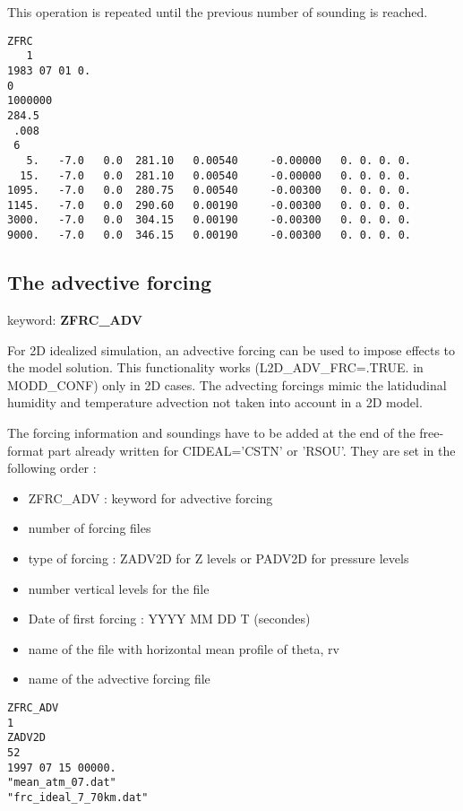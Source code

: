 This operation is repeated until the previous number of sounding is reached.

\begin{verbatim}
ZFRC
   1
1983 07 01 0.
0
1000000
284.5
 .008
 6
   5.   -7.0   0.0  281.10   0.00540     -0.00000   0. 0. 0. 0.
  15.   -7.0   0.0  281.10   0.00540     -0.00000   0. 0. 0. 0.
1095.   -7.0   0.0  280.75   0.00540     -0.00300   0. 0. 0. 0.
1145.   -7.0   0.0  290.60   0.00190     -0.00300   0. 0. 0. 0.
3000.   -7.0   0.0  304.15   0.00190     -0.00300   0. 0. 0. 0.
9000.   -7.0   0.0  346.15   0.00190     -0.00300   0. 0. 0. 0.
\end{verbatim}

\subsection{The advective forcing} \label{ss:adv_forcing}

keyword: {\bf ZFRC\_ADV} 

For 2D idealized simulation, an advective forcing can be used to impose effects to the model solution. This functionality works (L2D\_ADV\_FRC=.TRUE. in MODD\_CONF) only in 2D cases. The advecting forcings mimic the latidudinal humidity and temperature advection not taken into account in a 2D model.
         
The forcing information and soundings have to be added at the end of the
free-format part already written for CIDEAL='CSTN' or 'RSOU'. They are set in the following order : 
\begin{itemize}
\item ZFRC\_ADV : keyword for advective forcing
\item number of forcing files
\item type of forcing : ZADV2D for Z levels or PADV2D for  pressure levels
\item number vertical levels for the file
\item Date of first forcing : YYYY MM DD T (secondes)
\item name of the file with horizontal mean profile of theta, rv
\item name of the advective forcing file
\end{itemize}

                                   
\begin{verbatim}
ZFRC_ADV
1
ZADV2D
52
1997 07 15 00000.
"mean_atm_07.dat"
"frc_ideal_7_70km.dat"
\end{verbatim}

